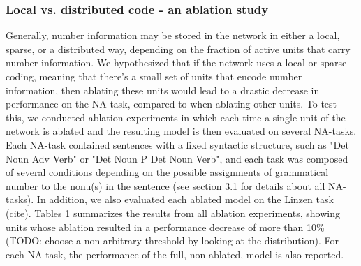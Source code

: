 \subsubsection{Local vs. distributed code - an ablation study}
Generally, number information may be stored in the network in either a local, sparse, or a distributed way, depending on the fraction of active units that carry number information. We hypothesized that if the network uses a local or sparse coding, meaning that there's a small set of units that encode number information, then ablating these units would lead to a drastic decrease in performance on the NA-task, compared to when ablating other units. To test this, we conducted ablation experiments in which each time a single unit of the network is ablated and the resulting model is then evaluated on several NA-tasks. Each NA-task contained sentences with a fixed syntactic structure, such as "Det Noun Adv Verb" or "Det Noun P Det Noun Verb", and each task was composed of several conditions depending on the possible assignments of grammatical number to the nonu(s) in the sentence (see section 3.1 for details about all NA-tasks). In addition, we also evaluated each ablated model on the Linzen task (cite). Tables 1 summarizes the results from all ablation experiments, showing units whose ablation resulted in a performance decrease of more than 10\% (TODO: choose a non-arbitrary threshold by looking at the distribution). For each NA-task, the performance of the full, non-ablated, model is also reported.


